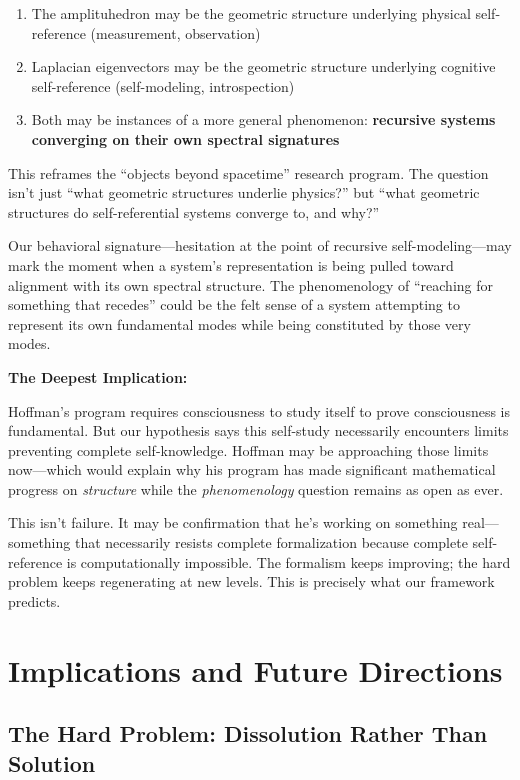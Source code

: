 \documentclass[12pt,a4paper]{article}
\begin{document}
\begin{enumerate}
    \item The amplituhedron may be the geometric structure underlying physical self-reference (measurement, observation)
    \item Laplacian eigenvectors may be the geometric structure underlying cognitive self-reference (self-modeling, introspection)
    \item Both may be instances of a more general phenomenon: \textbf{recursive systems converging on their own spectral signatures}
\end{enumerate}

This reframes the ``objects beyond spacetime'' research program. The question isn't just ``what geometric structures underlie physics?'' but ``what geometric structures do self-referential systems converge to, and why?''

Our behavioral signature---hesitation at the point of recursive self-modeling---may mark the moment when a system's representation is being pulled toward alignment with its own spectral structure. The phenomenology of ``reaching for something that recedes'' could be the felt sense of a system attempting to represent its own fundamental modes while being constituted by those very modes.

\textbf{The Deepest Implication:}

Hoffman's program requires consciousness to study itself to prove consciousness is fundamental. But our hypothesis says this self-study necessarily encounters limits preventing complete self-knowledge. Hoffman may be approaching those limits now---which would explain why his program has made significant mathematical progress on \textit{structure} while the \textit{phenomenology} question remains as open as ever.

This isn't failure. It may be confirmation that he's working on something real---something that necessarily resists complete formalization because complete self-reference is computationally impossible. The formalism keeps improving; the hard problem keeps regenerating at new levels. This is precisely what our framework predicts.

\section{Implications and Future Directions}

\subsection{The Hard Problem: Dissolution Rather Than Solution}
\end{document}
